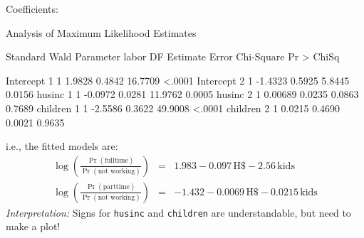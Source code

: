 \begin{frame}[fragile]
Coefficients:
\begin{Output}[gobble=2,baselinestretch=0.8, fontsize=\footnotesize]
                    Analysis of Maximum Likelihood Estimates
 
                                          Standard          Wald
  Parameter    labor    DF    Estimate       Error    Chi-Square    Pr > ChiSq

  Intercept    1         1      1.9828      0.4842       16.7709        <.0001
  Intercept    2         1     -1.4323      0.5925        5.8445        0.0156
  husinc       1         1     -0.0972      0.0281       11.9762        0.0005
  husinc       2         1     0.00689      0.0235        0.0863        0.7689
  children     1         1     -2.5586      0.3622       49.9008        <.0001
  children     2         1      0.0215      0.4690        0.0021        0.9635
\end{Output}
i.e., the fitted models are:
\begin{eqnarray*}
  \log \left( \frac{ \Pr ( \mbox{fulltime} ) }
  { \Pr ( \mbox{not working} ) } \right) & = &
  1.983 - 0.097 \,  \mbox{H\$} - 2.56 \,  \mbox{kids} \\  %
%
  \log \left( \frac{ \Pr ( \mbox{parttime} ) }
  { \Pr ( \mbox{not working} ) } \right) & = &
  -1.432 - 0.0069 \,  \mbox{H\$} - 0.0215 \,  \mbox{kids}  %
\end{eqnarray*}
\emph{Interpretation:} Signs for \texttt{husinc} and \texttt{children} are understandable,
but need to make a plot!
\end{frame}

